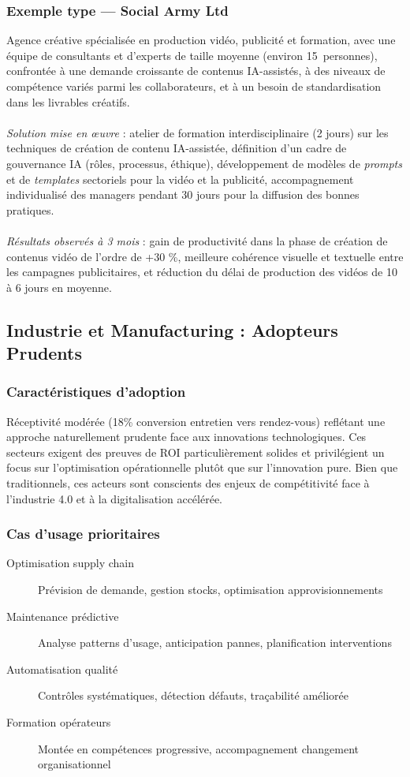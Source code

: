 \subsubsection{Exemple type — Social Army Ltd}

Agence créative spécialisée en production vidéo, publicité et formation, avec une équipe de consultants et d'experts de taille moyenne (environ 15~personnes), confrontée à une demande croissante de contenus IA-assistés, à des niveaux de compétence variés parmi les collaborateurs, et à un besoin de standardisation dans les livrables créatifs.
\\\\
\emph{Solution mise en œuvre} : atelier de formation interdisciplinaire (2 jours) sur les techniques de création de contenu IA-assistée, définition d’un cadre de gouvernance IA (rôles, processus, éthique), développement de modèles de \emph{prompts} et de \emph{templates} sectoriels pour la vidéo et la publicité, accompagnement individualisé des managers pendant 30 jours pour la diffusion des bonnes pratiques.
\\\\
\emph{Résultats observés à 3 mois} : gain de productivité dans la phase de création de contenus vidéo de l’ordre de +30 \%, meilleure cohérence visuelle et textuelle entre les campagnes publicitaires, et réduction du délai de production des vidéos de 10 à 6 jours en moyenne.


\subsection{Industrie et Manufacturing : Adopteurs Prudents}

\subsubsection{Caractéristiques d'adoption}
Réceptivité modérée (18\% conversion entretien vers rendez-vous) reflétant une approche naturellement prudente face aux innovations technologiques. Ces secteurs exigent des preuves de ROI particulièrement solides et privilégient un focus sur l'optimisation opérationnelle plutôt que sur l'innovation pure. Bien que traditionnels, ces acteurs sont conscients des enjeux de compétitivité face à l'industrie 4.0 et à la digitalisation accélérée.

\subsubsection{Cas d'usage prioritaires}
\begin{description}
    \item[Optimisation supply chain] Prévision de demande, gestion stocks, optimisation approvisionnements
    \item[Maintenance prédictive] Analyse patterns d'usage, anticipation pannes, planification interventions  
    \item[Automatisation qualité] Contrôles systématiques, détection défauts, traçabilité améliorée
    \item[Formation opérateurs] Montée en compétences progressive, accompagnement changement organisationnel
\end{description}

